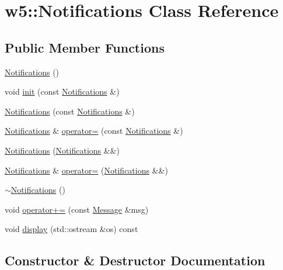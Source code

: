 \hypertarget{classw5_1_1Notifications}{}\section{w5\+:\+:Notifications Class Reference}
\label{classw5_1_1Notifications}
\subsection*{Public Member Functions}
\begin{DoxyCompactItemize}
\item 
\mbox{\hyperlink{classw5_1_1Notifications_af5482f22a6d4ad6c55256123776c8870}{Notifications}} ()
\item 
void \mbox{\hyperlink{classw5_1_1Notifications_a9cca3e863b2e21351fdfc096386adc1e}{init}} (const \mbox{\hyperlink{classw5_1_1Notifications}{Notifications}} \&)
\item 
\mbox{\hyperlink{classw5_1_1Notifications_a7fbdc734f79281a93523b7c7e8ec3c97}{Notifications}} (const \mbox{\hyperlink{classw5_1_1Notifications}{Notifications}} \&)
\item 
\mbox{\hyperlink{classw5_1_1Notifications}{Notifications}} \& \mbox{\hyperlink{classw5_1_1Notifications_ae61c37a0a75bef883aede67cac203bd0}{operator=}} (const \mbox{\hyperlink{classw5_1_1Notifications}{Notifications}} \&)
\item 
\mbox{\hyperlink{classw5_1_1Notifications_aeefa688a71494e3779e2b50f3bd9b5e7}{Notifications}} (\mbox{\hyperlink{classw5_1_1Notifications}{Notifications}} \&\&)
\item 
\mbox{\hyperlink{classw5_1_1Notifications}{Notifications}} \& \mbox{\hyperlink{classw5_1_1Notifications_a5a7b33d61d8ba367018f769975c9a98e}{operator=}} (\mbox{\hyperlink{classw5_1_1Notifications}{Notifications}} \&\&)
\item 
\mbox{\hyperlink{classw5_1_1Notifications_a657e031fdb6442a8aacb968ce351c569}{$\sim$\+Notifications}} ()
\item 
void \mbox{\hyperlink{classw5_1_1Notifications_ab6331b2dc2d9af68e462fdaecb74b43d}{operator+=}} (const \mbox{\hyperlink{classw5_1_1Message}{Message}} \&msg)
\item 
void \mbox{\hyperlink{classw5_1_1Notifications_a0272d577ac9277d500118d635b460670}{display}} (std\+::ostream \&os) const
\end{DoxyCompactItemize}


\subsection{Constructor \& Destructor Documentation}
\mbox{\label{classw5_1_1Notifications_af5482f22a6d4ad6c55256123776c8870}} 
